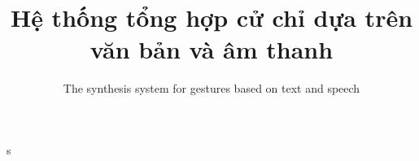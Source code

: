 \documentclass[10pt,mathserif]{beamer}
\title{\large \bfseries Hệ thống tổng hợp cử chỉ dựa trên \\ văn bản và âm thanh}
\subtitle{The synthesis system for gestures based on text and speech}
\begin{document}
\begin{frame}[plain]
	\titlepage
\end{frame}










%



s

%

\end{document}
